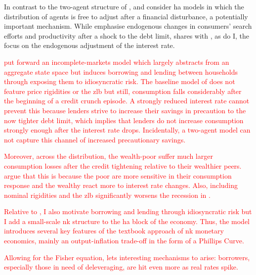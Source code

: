 \documentclass[12pt]{article} %
\numberwithin{equation}{section} %
\numberwithin{figure}{section}
\numberwithin{table}{section}
\begin{document}
In contrast to the two-agent structure of \textcite{egg2012}, \textcite{riosrull2015} and \textcite{gl2017} consider \Gls{ha} models in which the distribution of agents is free to adjust after a financial disturbance, a potentially important mechanism. While \textcite{riosrull2015} emphasise endogenous changes in consumers' search efforts and productivity after a shock to the debt limit, \textcite{gl2017} shares with \textcite{egg2012}, as do I, the focus on the endogenous adjustment of the interest rate.

\textcolor{red}{\textcite{gl2017} put forward an incomplete-markets model which largely abstracts from an aggregate state space but induces borrowing and lending between households through exposing them to idiosyncratic risk. The baseline model of \textcite{gl2017} does not feature price rigidities or the \Gls{zlb} but still, consumption falls considerably after the beginning of a credit crunch episode. A strongly reduced interest rate cannot prevent this because lenders strive to increase their savings in precaution to the now tighter debt limit, which implies that lenders do not increase consumption strongly enough after the interest rate drops. Incidentally, a two-agent model can not capture this channel of increased precautionary savings.}

\textcolor{red}{Moreover, across the distribution, the wealth-poor suffer much larger consumption losses after the credit tightening relative to their wealthier peers. \textcite{gl2017} argue that this is because the poor are more sensitive in their consumption response and the wealthy react more to interest rate changes. Also, including nominal rigidities and the \Gls{zlb} significantly worsens the recession in \textcite{gl2017}.}

\textcolor{red}{Relative to \textcite{gl2017}, I also motivate borrowing and lending through idiosyncratic risk but I add a small-scale \Gls{nk} structure to the \Gls{ha} block of the economy. Thus, the model introduces several key features of the textbook approach of \Gls{nk} monetary economics, mainly an output-inflation trade-off in the form of a Phillips Curve.} 

\textcolor{red}{Allowing for the Fisher equation, lets interesting mechanisms to arise: borrowers, especially those in need of deleveraging, are hit even more as real rates spike.}

\end{document}
